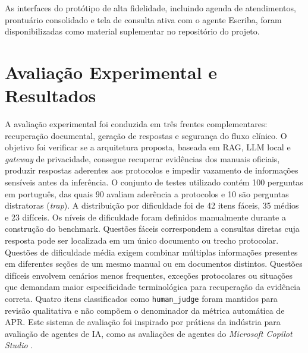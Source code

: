 \documentclass[12pt]{article}
\begin{document}



As interfaces do protótipo de alta fidelidade, incluindo agenda de atendimentos, prontuário consolidado e tela de consulta ativa com o agente Escriba, foram disponibilizadas como material suplementar no repositório do projeto.


\section{Avaliação Experimental e Resultados}

A avaliação experimental foi conduzida em três frentes complementares: recuperação documental, geração de respostas e segurança do fluxo clínico. 
O objetivo foi verificar se a arquitetura proposta, baseada em RAG, LLM local e \textit{gateway} de privacidade, consegue recuperar evidências dos manuais oficiais, produzir respostas aderentes aos protocolos e impedir vazamento de informações sensíveis antes da inferência.
O conjunto de testes utilizado contém 100 perguntas em português, das quais 90 avaliam aderência a protocolos e 10 são perguntas distratoras (\textit{trap}).
A distribuição por dificuldade foi de 42 itens fáceis, 35 médios e 23 difíceis.
Os níveis de dificuldade foram definidos manualmente durante a construção do benchmark.
Questões fáceis correspondem a consultas diretas cuja resposta pode ser localizada em um único documento ou trecho protocolar.
Questões de dificuldade média exigem combinar múltiplas informações presentes em diferentes seções de um mesmo manual ou em documentos distintos.
Questões difíceis envolvem cenários menos frequentes, exceções protocolares ou situações que demandam maior especificidade terminológica para recuperação da evidência correta.
Quatro itens classificados como \texttt{human\_judge} foram mantidos para revisão qualitativa e não compõem o denominador da métrica automática de APR.
Este sistema de avaliação foi inspirado por práticas da indústria para avaliação de agentes de IA, como as avaliações de agentes do \textit{Microsoft Copilot Studio} \cite{MicrosoftCopilotEval2026}.
\end{document}
